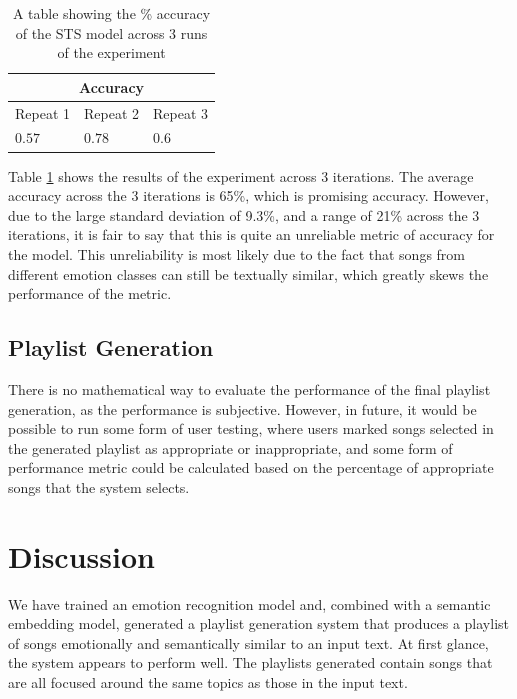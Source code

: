 \documentclass[11pt]{article}
\begin{document}
\begin{table}[H]
    \centering
    \caption{A table showing the \% accuracy of the STS model across 3 runs of the experiment}
    \begin{tabularx}{0.48\textwidth}{|X X X|} 
      \hline
      \multicolumn{3}{|c|}{Accuracy} \\ \hline 
      Repeat 1 & Repeat 2 & Repeat 3 \\ \hline
      $0.57$&$0.78$ &$0.6$ \\ \hline
    \end{tabularx}
    \label{tbl:stsAcc}
\end{table}

Table \ref{tbl:stsAcc} shows the results of the experiment across 3 iterations. The average accuracy across the 3 iterations is 65\%, which is promising accuracy. However, due to the large standard deviation of 9.3\%, and a range of 21\% across the 3 iterations, it is fair to say that this is quite an unreliable metric of accuracy for the model. This unreliability is most likely due to the fact that songs from different emotion classes can still be textually similar, which greatly skews the performance of the metric.

\subsection{Playlist Generation}

There is no mathematical way to evaluate the performance of the final playlist generation, as the performance is subjective. However, in future, it would be possible to run some form of user testing, where users marked songs selected in the generated playlist as appropriate or inappropriate, and some form of performance metric could be calculated based on the percentage of appropriate songs that the system selects.

\section{Discussion}

We have trained an emotion recognition model and, combined with a semantic embedding model, generated a playlist generation system that produces a playlist of songs emotionally and semantically similar to an input text. At first glance, the system appears to perform well. The playlists generated contain songs that are all focused around the same topics as those in the input text.
\end{document}
